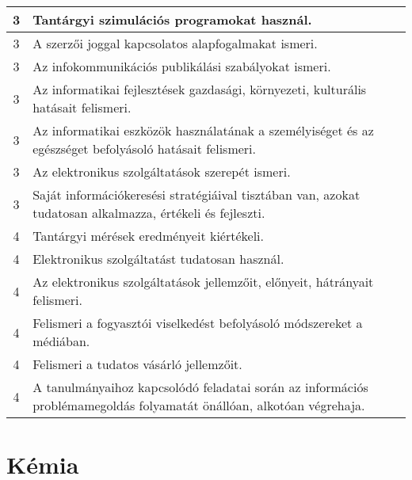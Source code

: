 \begin{longtable}{c | p{12cm} }
                                
                                          3 &  Tantárgyi szimulációs programokat használ. \\ \hline
                                          3 &  A szerzői joggal kapcsolatos alapfogalmakat ismeri. \\ \hline
                                          3 &  Az infokommunikációs publikálási szabályokat ismeri. \\ \hline
                                          3 &  Az informatikai fejlesztések gazdasági, környezeti, kulturális hatásait felismeri. \\ \hline
                                          3 &  Az informatikai eszközök használatának a személyiséget és az egészséget befolyásoló hatásait felismeri. \\ \hline
                                          3 &  Az elektronikus szolgáltatások szerepét ismeri. \\ \hline
                                          3 &  Saját információkeresési stratégiáival tisztában van, azokat tudatosan alkalmazza, értékeli és fejleszti. \\ \hline
                                      
                                
                                          4 &  Tantárgyi mérések eredményeit kiértékeli. \\ \hline
                                          4 &  Elektronikus szolgáltatást tudatosan használ. \\ \hline
                                          4 &  Az elektronikus szolgáltatások jellemzőit, előnyeit, hátrányait felismeri. \\ \hline
                                          4 &  Felismeri a fogyasztói viselkedést befolyásoló módszereket a médiában. \\ \hline
                                          4 &  Felismeri a tudatos vásárló jellemzőit. \\ \hline
                                          4 &  A tanulmányaihoz kapcsolódó feladatai során az információs problémamegoldás folyamatát önállóan, alkotóan végrehaja. \\ \hline
                                      
                        \end{longtable}
            \clearpage

        \section{Kémia}

